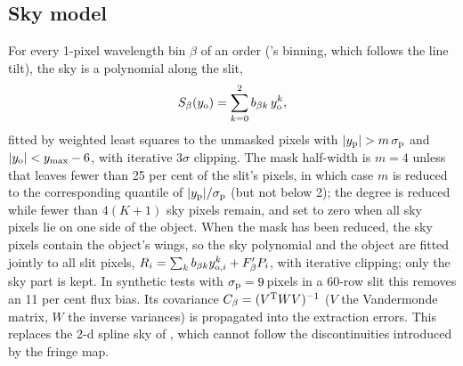 \subsection{Sky model}
\label{sec:sky}
For every 1-pixel wavelength bin $\beta$ of an order (\banzai{}'s binning, which follows the line tilt), the sky is a
polynomial along the slit,
\begin{equation}
S_\beta(y_{\rm o})=\sum_{k=0}^{2}b_{\beta k}\,y_{\rm o}^k,
\label{eq:sky}
\end{equation}
fitted by weighted least squares to the unmasked pixels with $|y_{\rm p}|>m\,\sigma_{\rm p}$ and
$|y_{\rm o}|<y_{\rm max}-6$, with iterative $3\sigma$ clipping. The mask half-width is $m=4$ unless that leaves fewer
than 25 per cent of the slit's pixels, in which case $m$ is reduced to the corresponding quantile of
$|y_{\rm p}|/\sigma_{\rm p}$ (but not below 2); the degree is reduced while fewer than $4(K+1)$ sky pixels remain, and set
to zero when all sky pixels lie on one side of the object. When the mask has been reduced, the sky pixels contain the
object's wings, so the sky polynomial and the object are fitted jointly to all slit pixels,
$R_i=\sum_k b_{\beta k}y_{{\rm o},i}^k+F'_\beta P_i$, with iterative clipping; only the sky part is kept. In synthetic
tests with $\sigma_{\rm p}=9$\,pixels in a 60-row slit this removes an 11 per cent flux bias. Its covariance
$C_\beta=(V^{\rm T}WV)^{-1}$ ($V$ the Vandermonde matrix, $W$ the inverse variances) is propagated into the
extraction errors. This replaces the 2-d spline sky of \banzai{} \citep{Kelson2003}, which cannot follow the
discontinuities introduced by the fringe map.

